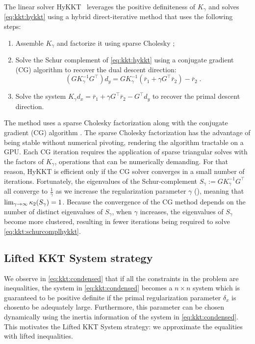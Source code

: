 The linear solver HyKKT~\cite{regev2023hykkt}
leverages the positive definiteness of $K_\gamma$ and solves
\eqref{eq:kkt:hykkt} using a hybrid direct-iterative method
that uses the following steps:
\begin{enumerate}
  \item Assemble $K_\gamma$ and factorize it using sparse Cholesky ;
  \item Solve the Schur complement of \eqref{eq:kkt:hykkt} using a conjugate gradient (CG)
    algorithm to recover the dual descent direction:
    \begin{equation}
      \label{eq:kkt:schurcomplhykkt}
      (G K_\gamma^{-1} G^\top) d_y = G K_\gamma^{-1} (\bar{r}_1 + \gamma G^\top \bar{r}_2) - \bar{r}_2 \; .
    \end{equation}
  \item Solve the system $K_\gamma d_x = \bar{r}_1 + \gamma G^\top \bar{r}_2 - G^\top d_y$
    to recover the primal descent direction.
\end{enumerate}
The method uses a sparse Cholesky factorization along with the conjugate gradient (CG) algorithm \cite{hestenes-stiefel-1952}.
The sparse Cholesky factorization has the advantage of being stable without
numerical pivoting, rendering the algorithm tractable on a GPU.
Each CG iteration requires the application of sparse triangular solves with the
factors of $K_\gamma$, operations that can be numerically demanding. For that reason,
HyKKT is efficient only if the CG solver converges in a small number of iterations.
Fortunately, the eigenvalues of the Schur-complement $S_\gamma := G K_\gamma^{-1} G^\top$
all converge to $\frac{1}{\gamma}$ as we increase the regularization parameter
$\gamma$ (\cite[Theorem 4]{regev2023hykkt}), meaning that $\lim_{\gamma \to \infty} \kappa_2(S_\gamma) = 1$.
Because the convergence of the CG method depends on the number of distinct eigenvalues of $S_{\gamma}$, when $\gamma$ increases, the eigenvalues of $S_{\gamma}$ become more clustered, resulting in fewer iterations being required to solve \eqref{eq:kkt:schurcomplhykkt}.

\subsection{Lifted KKT System strategy}
\label{sec:kkt:sckkt}

We observe in \eqref{eq:kkt:condensed} that if all the constraints in the problem are inequalities, the system in \eqref{eq:kkt:condensed} becomes a $n \times n$ system which is guaranteed to be positive definite if the primal regularization parameter $\delta_x$ is chosento be adequately large. Furthermore, this parameter can be chosen dynamically using the inertia information of the system in \eqref{eq:kkt:condensed}. This motivates the Lifted KKT System strategy: we approximate the equalities with lifted inequalities.

